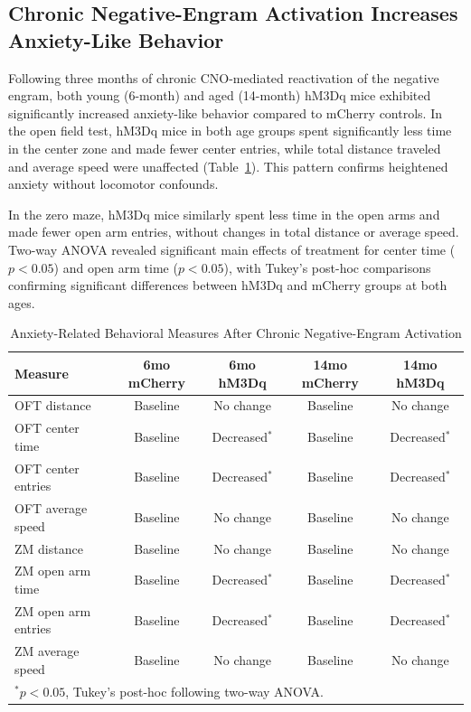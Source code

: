 \documentclass[11pt]{article}
\begin{document}
\subsection{Chronic Negative-Engram Activation Increases Anxiety-Like Behavior}

Following three months of chronic CNO-mediated reactivation of the negative engram, both young (6-month) and aged (14-month) hM3Dq mice exhibited significantly increased anxiety-like behavior compared to mCherry controls. In the open field test, hM3Dq mice in both age groups spent significantly less time in the center zone and made fewer center entries, while total distance traveled and average speed were unaffected (Table~\ref{tab:anxiety}). This pattern confirms heightened anxiety without locomotor confounds.

In the zero maze, hM3Dq mice similarly spent less time in the open arms and made fewer open arm entries, without changes in total distance or average speed. Two-way ANOVA revealed significant main effects of treatment for center time ($p < 0.05$) and open arm time ($p < 0.05$), with Tukey's post-hoc comparisons confirming significant differences between hM3Dq and mCherry groups at both ages.

\begin{table}[ht]
\centering
\caption{Anxiety-Related Behavioral Measures After Chronic Negative-Engram Activation}
\label{tab:anxiety}
\begin{tabular}{lcccc}
\toprule
\textbf{Measure} & \textbf{6mo mCherry} & \textbf{6mo hM3Dq} & \textbf{14mo mCherry} & \textbf{14mo hM3Dq} \\
\midrule
OFT distance & Baseline & No change & Baseline & No change \\
OFT center time & Baseline & Decreased$^{*}$ & Baseline & Decreased$^{*}$ \\
OFT center entries & Baseline & Decreased$^{*}$ & Baseline & Decreased$^{*}$ \\
OFT average speed & Baseline & No change & Baseline & No change \\
ZM distance & Baseline & No change & Baseline & No change \\
ZM open arm time & Baseline & Decreased$^{*}$ & Baseline & Decreased$^{*}$ \\
ZM open arm entries & Baseline & Decreased$^{*}$ & Baseline & Decreased$^{*}$ \\
ZM average speed & Baseline & No change & Baseline & No change \\
\bottomrule
\multicolumn{5}{l}{\small $^{*}p < 0.05$, Tukey's post-hoc following two-way ANOVA.}
\end{tabular}
\end{table}
\end{document}
